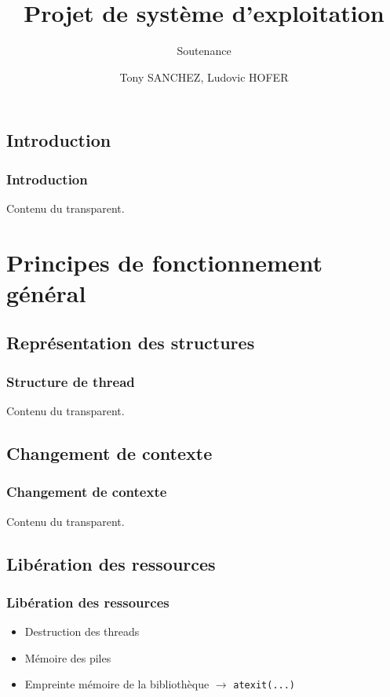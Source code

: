 \documentclass{beamer}
\title{Projet de système d'exploitation}
\subtitle{Soutenance}
\author{Tony SANCHEZ, Ludovic HOFER}
\institute{ENSERIB-MATMECA}
\begin{document}
 
\maketitle

\tableofcontents
 
\begin{frame}
\section{Introduction}
\frametitle{Introduction}
 
Contenu du transparent.
 
\end{frame}

\section{Principes de fonctionnement général}
\subsection{Représentation des structures}

\begin{frame}
\frametitle{Structure de thread}
 
Contenu du transparent.
 
\end{frame}

\subsection{Changement de contexte}

\begin{frame}
  \frametitle{Changement de contexte}
  Contenu du transparent.

\end{frame}

\subsection{Libération des ressources}

\begin{frame}
  \frametitle{Libération des ressources}
  \begin{itemize}
  \item Destruction des threads
  \item Mémoire des piles
  \item Empreinte mémoire de la bibliothèque
    $\rightarrow $ \verb!atexit(...)!
  \end{itemize}
\end{frame}
\end{document}
